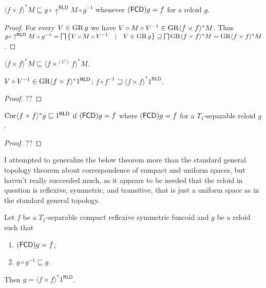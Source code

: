 \begin{prop}
  $\langle f \times f \rangle^{\ast} M \sqsubseteq g \circ
  \uparrow^{\mathsf{RLD}} M \circ g^{- 1}$ whenever
  $(\mathsf{FCD}) g = f$ for a reloid $g$.
\end{prop}

\begin{proof}
  For every $V \in \operatorname{GR} g$ we have $V \circ M \circ V^{- 1} \in \operatorname{GR}
  \langle f \times f \rangle^{\ast} M$. Thus $g \circ
  \uparrow^{\mathsf{RLD}} M \circ g^{- 1} = \bigsqcap \left\{ V \circ M
  \circ V^{- 1} \hspace{1em} | \hspace{1em} V \in \operatorname{GR} g \right\}
  \sqsupseteq \bigsqcap \operatorname{GR} \langle f \times f \rangle^{\ast} M =
  \operatorname{GR} \langle f \times f \rangle^{\ast} M$.
\end{proof}

\begin{cor}
  $\langle f \times f \rangle^{\ast} M \sqsubseteq \langle f \times^{(C)} f
  \rangle^{\ast} M$.
\end{cor}

\begin{cor}
  $V \circ V^{- 1} \in \operatorname{GR} \langle f \times f \rangle^{\ast} 1^{\mathsf{RLD}}$; $f
  \circ f^{- 1} \sqsupseteq \langle f \times f \rangle^{\ast} 1^{\mathsf{RLD}}$.
\end{cor}

\begin{proof}
  ??
\end{proof}

\begin{lem}
  $\operatorname{Cor} \langle f \times f \rangle^{\ast} g \sqsubseteq 1^{\mathsf{RLD}}$ if
  $(\mathsf{FCD}) g = f$ where $(\mathsf{FCD}) g = f$ for a
  $T_1$-separable reloid $g$.
\end{lem}

\begin{proof}
  ??
\end{proof}

\begin{rem}
  I attempted to generalize the below theorem more than the standard general
  topology theorem about correspondence of compact and uniform spaces, but
  haven't really succeeded much, as it appears to be needed that the reloid in
  question is reflexive, symmetric, and transitive, that is just a uniform
  space as in the standard general topology.
\end{rem}

\begin{thm}
  Let $f$ be a $T_1$-separable compact reflexive symmetric funcoid and $g$ be
  a reloid such that
  \begin{enumerate}
    \item $(\mathsf{FCD}) g = f$;
    
    \item $g \circ g^{- 1} \sqsubseteq g$.
  \end{enumerate}
  Then $g = \langle f \times f \rangle^{\ast} 1^{\mathsf{RLD}}$.
\end{thm}

